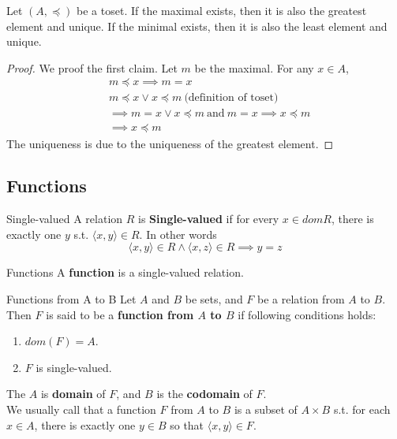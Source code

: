\begin{theorem}{}{}
  Let $(A,\preceq)$ be a toset. If the maximal exists, then it is
  also the greatest element and unique.
  If the minimal exists, then it is also the least element and unique.
\end{theorem}

\begin{proof}
  We proof the first claim. Let $m$ be the maximal. For any $x \in A$,
  \begin{align*}
    &m \preceq x \implies m = x\\
    &m \preceq x \lor x \preceq m \ \text{(definition of toset)}\\
    &\implies m = x \lor x \preceq m \ \text{and}\  m = x \implies x \preceq m\\
    &\implies x \preceq m
  \end{align*}
  The uniqueness is due to the uniqueness of the greatest element.
\end{proof}

\subsection{Functions}

\begin{definition}{Single-valued}{}
  A relation $R$ is \textbf{Single-valued} if for every $x \in dom
  R$, there is exactly one $y$ s.t. $\langle x,y \rangle \in R$. In other words
  \begin{equation*}
    \langle x,y \rangle \in R \land \langle x,z \rangle \in R \implies y = z
  \end{equation*}
\end{definition}

\begin{definition}{Functions}{}
  A \textbf{function} is a single-valued relation.
\end{definition}

\begin{definition}{Functions from A to B}{}
  Let $A$ and $B$ be sets, and $F$ be a relation from $A$ to $B$. Then $F$ is
  said to be a \textbf{function from $A$ to $B$} if following conditions holds:
  \begin{enumerate}

    \item $dom(F) = A$.
    \item $F$ is single-valued.

  \end{enumerate}
  The $A$ is \textbf{domain} of $F$, and $B$ is the \textbf{codomain} of $F$.\\
  We usually call that a function $F$ from $A$ to $B$ is a subset of
  $A \times B$ s.t. for each $x \in A$, there is exactly one $y \in
  B$ so that $\langle x,y \rangle \in F$.
\end{definition}

